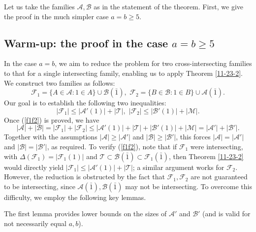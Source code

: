 \documentclass[11pt]{article}
\newcommand{\m}{\mathcal}
\begin{document}
Let us take the families $\m A, \m B$ as in the statement of the theorem. First, we give the proof in the much simpler case $a=b\ge 5$.
\subsection{Warm-up: the proof in the case $a=b\ge 5$}

In the case $a=b$, we aim to reduce the problem for two cross-intersecting families to that for a single intersecting family, enabling us to apply Theorem \ref{11-23-2}.
We construct two families as follows:
\begin{equation}\label{deff1f2}
\m F_1=\{A\in \m A: 1\in A\}\cup \m B(\bar{1}), \,\, \m F_2=\{B\in \m B: 1\in B\}\cup \m A(\bar{1}).
\end{equation}
Our goal is to establish the following two inequalities:  
\begin{equation}\label{f1f2}
    |\m F_1|\le |\m A'(1)|+|\m T|, \,\, |\m F_2|\le |\m B'(1)|+|\m M|.
\end{equation}
Once (\ref{f1f2}) is proved, we have 
$$|\m A|+|\m B|=|\m F_1|+|\m F_2|\le|\m A'(1)|+|\m T| + |\m B'(1)|+|\m M|=|\m A'|+|\m B'|.$$
Together with the assumptions $|\m A|\ge |\m A'|$ and $|\m B|\ge |\m B'|$, this forces $|\m A|= |\m A'|$ and $|\m B|= |\m B'|$, as required. 
To verify (\ref{f1f2}), 
note that if $\m F_1$ were intersecting, with $\Delta(\m F_1)=|\m F_1(1)|$ and $\m T \subset \m B(\bar1) \subset \m F_1(\bar{1})$, then Theorem \ref{11-23-2} would directly yield $|\m F_1|\le |\m A'(1)|+|\m T|$;
a similar argument works for $\mathcal{F}_2$. 
However, the reduction is obstructed by the fact that $\m F_1, \m F_2$ are not guaranteed to be intersecting, since $\m A(\bar1), \m B(\bar1)$ may not be intersecting. 
To overcome this difficulty, we employ the following key lemmas.

The first lemma provides lower bounds on the sizes of $\m A'$ and $\m B'$ (and is valid for not necessarily equal $a,b$). 
\end{document}
